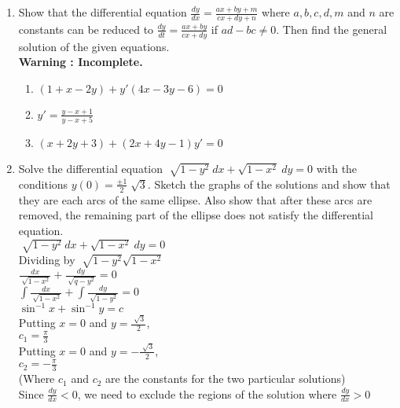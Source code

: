 \documentclass[a4paper]{article}
\begin{document}
\begin{enumerate}
{\begin{enumerate}
\end{enumerate}
}

\item{Show that the differential equation $\frac{dy}{dx}=\frac{ax+by+m}{cx+dy+n}$ where $a, b, c, d, m$ and $n$ are constants can be reduced to $\frac{dy}{dt}=\frac{ax+by}{cx+dy}$ if $ad-bc\neq 0$. Then find the general solution of the given equations.
\\ \textbf{Warning : Incomplete.}
\begin{enumerate}
\item{$(1+x-2y)+y'(4x-3y-6)=0$}
\item{$y'=\frac{y-x+1}{y-x+5}$}
\item{$(x+2y+3)+(2x+4y-1)y'=0$}
\end{enumerate}
}

\item{Solve the differential equation $\sqrt[]{1-y^2} \ dx + \sqrt{1-x^2} \ dy=0$ with the conditions $y(0)=\frac{\pm1}{2}\sqrt[]{3}$. Sketch the graphs of the solutions and show that they are each arcs of the same ellipse. Also show that after these arcs are removed, the remaining part of the ellipse does not satisfy the differential equation.
\\$\sqrt[]{1-y^2} \ dx + \sqrt{1-x^2} \ dy=0$
\\Dividing by $\sqrt[]{1-y^2}\sqrt{1-x^2}$
\\$\frac{dx}{\sqrt[]{1-x^2}}+\frac{dy}{\sqrt[]{q-y^2}}=0$
\\$\int\frac{dx}{\sqrt[]{1-x^2}}+\int\frac{dy}{\sqrt[]{1-y^2}}=0$
\\$\sin^{-1}x+\sin^{-1}y=c$
\\Putting $x=0$ and $y=\frac{\sqrt[]{3}}{2}$,
\\$c_1=\frac{\pi}{3}$
\\Putting $x=0$ and $y=-\frac{\sqrt[]{3}}{2}$,
\\$c_2=-\frac{\pi}{3}$
\\(Where $c_1$ and $c_2$ are the constants for the two particular solutions)
\\Since $\frac{dy}{dx}<0$, we need to exclude the regions of the solution where $\frac{dy}{dx}>0$
\\
}
\end{enumerate}
\end{document}
